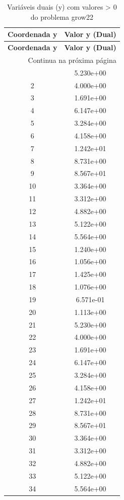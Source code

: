 \documentclass[12pt]{article}
\begin{document}
\begin{longtable}{@{}cc@{}}
\caption{Variáveis duais (y) com valores > 0 do problema grow22} \\
\toprule
\textbf{Coordenada y} & \textbf{Valor y (Dual)} \\
\midrule
\endfirsthead

\toprule
\textbf{Coordenada y} & \textbf{Valor y (Dual)} \\
\midrule
\endhead

\midrule \multicolumn{2}{r}{{Continua na próxima página}} \\ \midrule
\endfoot

\bottomrule
\endlastfoot
1 & 5.230e+00 \\
2 & 4.000e+00 \\
3 & 1.691e+00 \\
4 & 6.147e+00 \\
5 & 3.284e+00 \\
6 & 4.158e+00 \\
7 & 1.242e+01 \\
8 & 8.731e+00 \\
9 & 8.567e+01 \\
10 & 3.364e+00 \\
11 & 3.312e+00 \\
12 & 4.882e+00 \\
13 & 5.122e+00 \\
14 & 5.564e+00 \\
15 & 1.240e+00 \\
16 & 1.056e+00 \\
17 & 1.425e+00 \\
18 & 1.076e+00 \\
19 & 6.571e-01 \\
20 & 1.113e+00 \\
21 & 5.230e+00 \\
22 & 4.000e+00 \\
23 & 1.691e+00 \\
24 & 6.147e+00 \\
25 & 3.284e+00 \\
26 & 4.158e+00 \\
27 & 1.242e+01 \\
28 & 8.731e+00 \\
29 & 8.567e+01 \\
30 & 3.364e+00 \\
31 & 3.312e+00 \\
32 & 4.882e+00 \\
33 & 5.122e+00 \\
34 & 5.564e+00 \\

\end{longtable}
\end{document}
